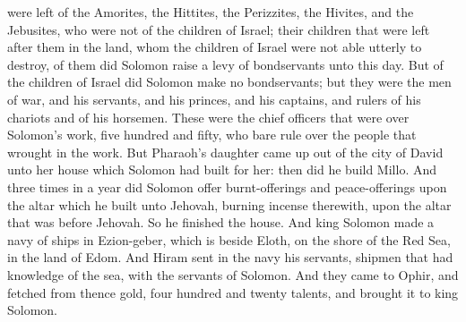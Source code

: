 were left of the Amorites, the Hittites, the Perizzites, the Hivites, and the Jebusites, who were not of the children of Israel; their children that were left after them in the land, whom the children of Israel were not able utterly to destroy, of them did Solomon raise a levy of bondservants unto this day. But of the children of Israel did Solomon make no bondservants; but they were the men of war, and his servants, and his princes, and his captains, and rulers of his chariots and of his horsemen.  These were the chief officers that were over Solomon’s work, five hundred and fifty, who bare rule over the people that wrought in the work.  But Pharaoh’s daughter came up out of the city of David unto her house which Solomon had built for her: then did he build Millo.  And three times in a year did Solomon offer burnt-offerings and peace-offerings upon the altar which he built unto Jehovah, burning incense therewith, upon the altar that was before Jehovah. So he finished the house.  And king Solomon made a navy of ships in Ezion-geber, which is beside Eloth, on the shore of the Red Sea, in the land of Edom. And Hiram sent in the navy his servants, shipmen that had knowledge of the sea, with the servants of Solomon. And they came to Ophir, and fetched from thence gold, four hundred and twenty talents, and brought it to king Solomon. 

